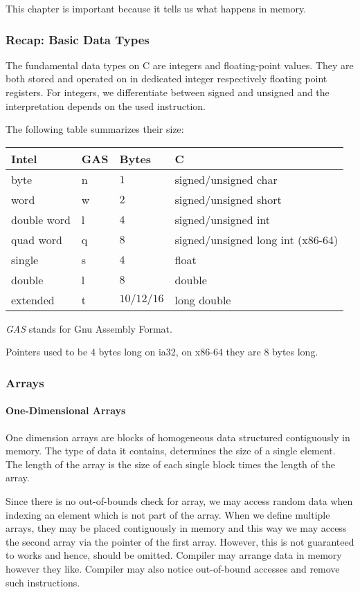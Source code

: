 

This chapter is important because it tells us what happens in memory.

\subsubsection{Recap: Basic Data Types}
The fundamental data types on C are integers and floating-point values. They are both stored and operated on in dedicated integer respectively floating point registers. For integers, we differentiate between signed and unsigned and the interpretation depends on the used instruction.

The following table summarizes their size:

\begin{tabular}{l l l l}
    Intel & GAS & Bytes & C\\
    \hline
    byte & n & $1$ & signed/unsigned char\\
    word & w & $2$ & signed/unsigned short\\
    double word & l & $4$ & signed/unsigned int\\
    quad word & q & $8$ & signed/unsigned long int (x86-64)\\
    \hline
    single & s & $4$ & float\\
    double & l & $8$ & double\\
    extended & t & $10/12/16$ & long double\\
\end{tabular}

\textit{GAS} stands for Gnu Assembly Format.

Pointers used to be $4$ bytes long on ia32, on x86-64 they are $8$ bytes long.

\subsubsection{Arrays}
\paragraph{One-Dimensional Arrays}
One dimension arrays are blocks of homogeneous data structured contiguously in memory. The type of data it contains, determines the size of a single element. The length of the array is the size of each single block times the length of the array.

Since there is no out-of-bounds check for array, we may access random data when indexing an element which is not part of the array. When we define multiple arrays, they may be placed contiguously in memory and this way we may access the second array via the pointer of the first array. However, this is not guaranteed to works and hence, should be omitted. Compiler may arrange data in memory however they like. Compiler may also notice out-of-bound accesses and remove such instructions.

